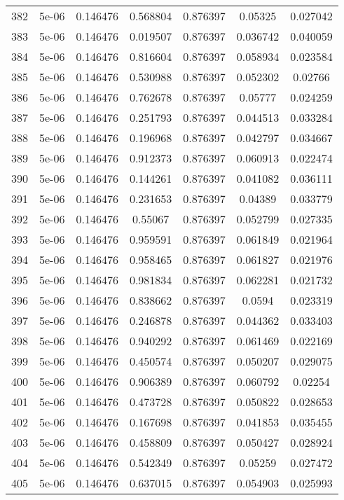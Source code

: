 \begin{table}
\begin{tabular*}{\linewidth}{c|c|c|c|c|c|c}
382 & 5e-06 & 0.146476 & 0.568804 & 0.876397 & 0.05325 & 0.027042\\
383 & 5e-06 & 0.146476 & 0.019507 & 0.876397 & 0.036742 & 0.040059\\
384 & 5e-06 & 0.146476 & 0.816604 & 0.876397 & 0.058934 & 0.023584\\
385 & 5e-06 & 0.146476 & 0.530988 & 0.876397 & 0.052302 & 0.02766\\
386 & 5e-06 & 0.146476 & 0.762678 & 0.876397 & 0.05777 & 0.024259\\
387 & 5e-06 & 0.146476 & 0.251793 & 0.876397 & 0.044513 & 0.033284\\
388 & 5e-06 & 0.146476 & 0.196968 & 0.876397 & 0.042797 & 0.034667\\
389 & 5e-06 & 0.146476 & 0.912373 & 0.876397 & 0.060913 & 0.022474\\
390 & 5e-06 & 0.146476 & 0.144261 & 0.876397 & 0.041082 & 0.036111\\
391 & 5e-06 & 0.146476 & 0.231653 & 0.876397 & 0.04389 & 0.033779\\
392 & 5e-06 & 0.146476 & 0.55067 & 0.876397 & 0.052799 & 0.027335\\
393 & 5e-06 & 0.146476 & 0.959591 & 0.876397 & 0.061849 & 0.021964\\
394 & 5e-06 & 0.146476 & 0.958465 & 0.876397 & 0.061827 & 0.021976\\
395 & 5e-06 & 0.146476 & 0.981834 & 0.876397 & 0.062281 & 0.021732\\
396 & 5e-06 & 0.146476 & 0.838662 & 0.876397 & 0.0594 & 0.023319\\
397 & 5e-06 & 0.146476 & 0.246878 & 0.876397 & 0.044362 & 0.033403\\
398 & 5e-06 & 0.146476 & 0.940292 & 0.876397 & 0.061469 & 0.022169\\
399 & 5e-06 & 0.146476 & 0.450574 & 0.876397 & 0.050207 & 0.029075\\
400 & 5e-06 & 0.146476 & 0.906389 & 0.876397 & 0.060792 & 0.02254\\
401 & 5e-06 & 0.146476 & 0.473728 & 0.876397 & 0.050822 & 0.028653\\
402 & 5e-06 & 0.146476 & 0.167698 & 0.876397 & 0.041853 & 0.035455\\
403 & 5e-06 & 0.146476 & 0.458809 & 0.876397 & 0.050427 & 0.028924\\
404 & 5e-06 & 0.146476 & 0.542349 & 0.876397 & 0.05259 & 0.027472\\
405 & 5e-06 & 0.146476 & 0.637015 & 0.876397 & 0.054903 & 0.025993\\
\end{tabular*}
\end{table}
